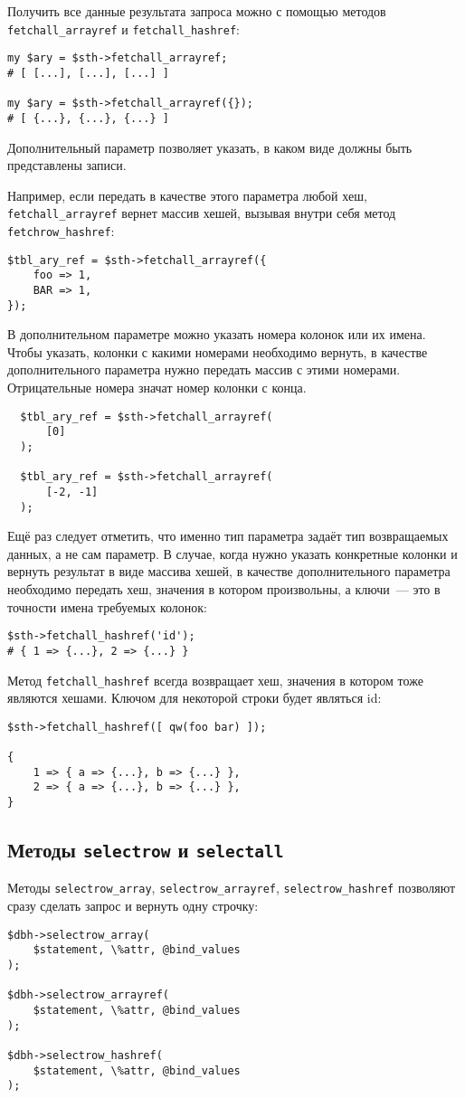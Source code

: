 Получить все данные результата запроса можно с помощью методов \verb|fetchall_arrayref| и \verb|fetchall_hashref|:
\begin{verbatim}
my $ary = $sth->fetchall_arrayref;
# [ [...], [...], [...] ]

my $ary = $sth->fetchall_arrayref({});
# [ {...}, {...}, {...} ]
\end{verbatim}
Дополнительный параметр позволяет указать, в каком виде должны быть представлены записи.

Например, если передать в качестве этого параметра любой хеш, \verb|fetchall_arrayref| вернет массив хешей, вызывая внутри себя метод \verb|fetchrow_hashref|:
\begin{verbatim}
$tbl_ary_ref = $sth->fetchall_arrayref({
    foo => 1,
    BAR => 1,
});
\end{verbatim}
В дополнительном параметре можно указать номера колонок или их имена. Чтобы указать, колонки с какими номерами необходимо вернуть, в качестве дополнительного параметра нужно передать массив с этими номерами. Отрицательные номера значат номер колонки с конца.
\begin{verbatim}
  $tbl_ary_ref = $sth->fetchall_arrayref(
      [0]
  );

  $tbl_ary_ref = $sth->fetchall_arrayref(
      [-2, -1]
  );
\end{verbatim}

Ещё раз следует отметить, что именно тип параметра задаёт тип возвращаемых данных, а не сам параметр. В случае, когда нужно указать конкретные колонки и вернуть результат в виде массива хешей, в качестве дополнительного параметра необходимо передать хеш, значения в котором произвольны, а ключи~--- это в точности имена требуемых колонок:
\begin{verbatim}
$sth->fetchall_hashref('id');
# { 1 => {...}, 2 => {...} }
\end{verbatim}

Метод \verb|fetchall_hashref| всегда возвращает хеш, значения в котором тоже являются хешами. Ключом для некоторой строки будет являться id:
\begin{verbatim}
$sth->fetchall_hashref([ qw(foo bar) ]);

{
    1 => { a => {...}, b => {...} },
    2 => { a => {...}, b => {...} },
}
\end{verbatim}

\subsection{Методы \texttt{selectrow} и \texttt{selectall}}
Методы \verb|selectrow_array|, \verb|selectrow_arrayref|,  \verb|selectrow_hashref| позволяют сразу сделать запрос и вернуть одну строчку:
\begin{verbatim}
$dbh->selectrow_array(
    $statement, \%attr, @bind_values
);

$dbh->selectrow_arrayref(
    $statement, \%attr, @bind_values
);

$dbh->selectrow_hashref(
    $statement, \%attr, @bind_values
);
\end{verbatim}

